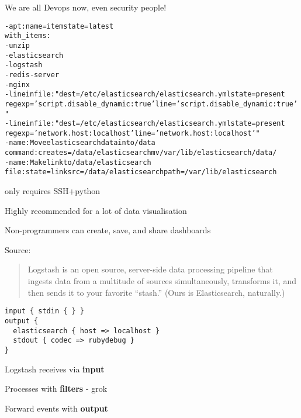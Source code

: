 \documentclass[Screen16to9,17pt]{foils}
\begin{document}
\vskip 1cm
\centerline{We are all Devops now, even security people!}



\begin{alltt}\small
- apt: name={{ item }} state=latest
  with_items:
        - unzip
        - elasticsearch
        - logstash
        - redis-server
        - nginx
- lineinfile: "dest=/etc/elasticsearch/elasticsearch.yml state=present
  regexp='script.disable_dynamic: true' line='script.disable_dynamic: true'"
- lineinfile: "dest=/etc/elasticsearch/elasticsearch.yml state=present
  regexp='network.host: localhost' line='network.host: localhost'"
- name: Move elasticsearch data into /data
  command: creates=/data/elasticsearch mv /var/lib/elasticsearch /data/
- name: Make link to /data/elasticsearch
  file: state=link src=/data/elasticsearch path=/var/lib/elasticsearch
\end{alltt}
\vskip 5mm
\centerline{only requires SSH+python }




\centerline{Highly recommended for a lot of data visualisation}

Non-programmers can create, save, and share dashboards

Source:




\begin{quote}
  Logstash is an open source, server-side data processing pipeline that ingests data from a multitude of sources simultaneously, transforms it, and then sends it to your favorite “stash.” (Ours is Elasticsearch, naturally.)\\
\end{quote}

\begin{verbatim}
input { stdin { } }
output {
  elasticsearch { host => localhost }
  stdout { codec => rubydebug }
}
\end{verbatim}



\begin{list2}
\item Logstash receives via {\bf input}
\item Processes with {\bf filters} - grok
\item Forward events with {\bf output}
\end{list2}
\end{document}
